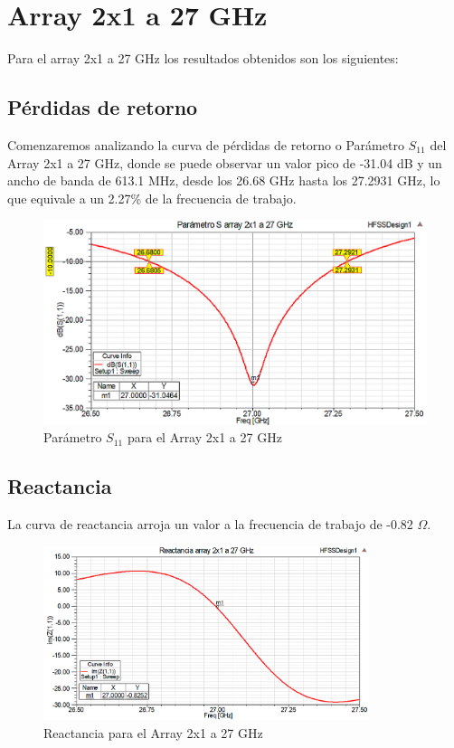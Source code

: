 \section{Array 2x1 a 27 GHz}
\par Para el array 2x1 a 27 GHz los resultados obtenidos son los siguientes:

\subsection{Pérdidas de retorno}
\par Comenzaremos analizando la curva de pérdidas de retorno o Parámetro $S_{11}$ del Array 2x1 a 27 GHz, donde se puede observar un valor pico de -31.04 dB y un ancho de banda de 613.1 MHz, desde los 26.68 GHz hasta los 27.2931 GHz, lo que equivale a un 2.27\% de la frecuencia de trabajo.
\\
\begin{figure}[H]
    \centering
        \includegraphics[width=\textwidth]{archivos/analisis/2x13/1}
        \caption{Parámetro $S_{11}$ para el Array 2x1 a 27 GHz}
        \label{fig:s2x13}
\end{figure}

\subsection{Reactancia}
\par La curva de reactancia arroja un valor a la frecuencia de trabajo de -0.82 $\Omega$.
\\
\begin{figure}[H]
    \centering
        \includegraphics[width=0.85\textwidth]{archivos/analisis/2x13/2}
        \caption{Reactancia para el Array 2x1 a 27 GHz}
        \label{fig:react2x13}
\end{figure}


